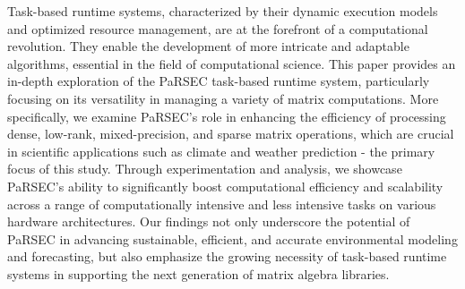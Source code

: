 Task-based runtime systems, characterized by their dynamic execution models and optimized resource management, are at the forefront of a computational revolution. They enable the development of more intricate and adaptable algorithms, essential in the field of computational science. This paper provides an in-depth exploration of the PaRSEC task-based runtime system, particularly focusing on its versatility in managing a variety of matrix computations. More specifically, we examine PaRSEC's role in enhancing the efficiency of processing dense, low-rank, mixed-precision, and sparse matrix operations, which are crucial in scientific applications such as climate and weather prediction - the primary focus of this study. Through experimentation and analysis, we showcase PaRSEC's ability to significantly boost computational efficiency and scalability across a range of computationally intensive and less intensive tasks on various hardware architectures. Our findings not only underscore the potential of PaRSEC in advancing sustainable, efficient, and accurate environmental modeling and forecasting, but also emphasize the growing necessity of task-based runtime systems in supporting the next generation of matrix algebra libraries.
